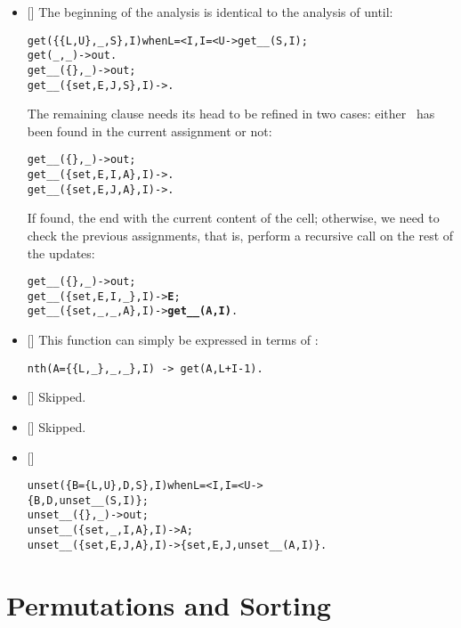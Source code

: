 \begin{itemize}
  \item {[]} The beginning of the analysis is identical
    to the analysis of  until:
\begin{alltt}
get(\{\{L,U\},_,S\},I) when L =< I,I =< U -> get__(S,I);
get(          _,_)                    -> out.
get__(         \{\},_)                  -> out;
get__(\{set,E,J,S\},I)                  -> .
\end{alltt}
  The remaining clause needs its head to be refined in two cases:
  either~ has been found in the current assignment or not:
\begin{alltt}
get__(         \{\},_)                  -> out;
get__(\{set,E,I,A\},I)                  -> .
get__(\{set,E,J,A\},I)                  -> .
\end{alltt}
  If found, the end with the current content of the cell; otherwise,
  we need to check the previous assignments, that is, perform a
  recursive call on the rest of the updates:
\begin{alltt}
get__(         \{\},_)                  -> out;
get__(\{set,E,I,_\},I)                  -> \textbf{E};
get__(\{set,_,_,A\},I)                  -> \textbf{get\_\_(A,I)}.
\end{alltt}

  \item {[]} This function can simply be expressed in
    terms of :
\begin{verbatim}
nth(A={{L,_},_,_},I) -> get(A,L+I-1).
\end{verbatim}

  \item {[]} Skipped.
    
  \item {[]} Skipped.

  \item {[]}
\begin{alltt}
unset(\{B=\{L,U\},D,S\},I) when L =< I,I =< U ->
\hfill\{B,D,unset__(S,I)\};
unset__(         \{\},_) -> out;\hfill% \emph{Absent}
unset__(\{set,_,I,A\},I) -> A;\hfill% \emph{Found}
unset__(\{set,E,J,A\},I) -> \{set,E,J,unset__(A,I)\}.
\end{alltt}

\end{itemize}


\section*{Permutations and Sorting}
\label{ans:permutations_and_sorting}

